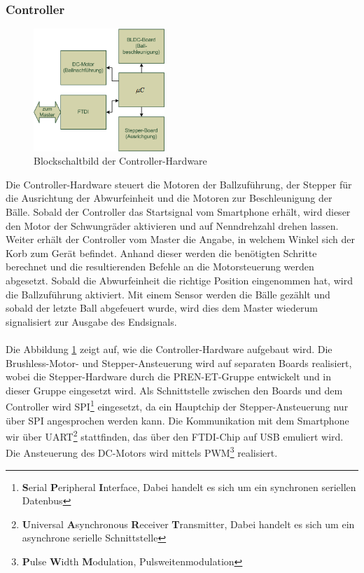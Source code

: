 \subsubsection{Controller}
\label{sec:Controller}
	\begin{figure}
		\centering
		\includegraphics[width=0.44\textwidth]{Enddokumentation/Loesungskonzept/Bilder/Blockschaltbild_Controller.png}
		\caption{Blockschaltbild der Controller-Hardware}
		\label{fig:Blockschaltbild_Controller}
	\end{figure}
	Die Controller-Hardware steuert die Motoren der Ballzuführung, der Stepper für die Ausrichtung 
	der Abwurfeinheit und die Motoren zur Beschleunigung der Bälle. Sobald der Controller das Startsignal vom Smartphone erhält, 
	wird dieser den Motor der Schwungräder aktivieren und auf Nenndrehzahl drehen lassen. Weiter erhält der Controller vom Master die Angabe, 
	in welchem Winkel sich der Korb zum Gerät befindet. Anhand dieser werden die benötigten Schritte berechnet und die resultierenden Befehle 
	an die Motorsteuerung werden abgesetzt. Sobald die Abwurfeinheit die richtige Position eingenommen hat, wird die Ballzuführung aktiviert. 
	Mit einem Sensor werden die Bälle gezählt und sobald der letzte Ball abgefeuert wurde, wird dies dem Master wiederum signalisiert zur Ausgabe des Endsignals.\\
	\\	
	Die Abbildung \ref{fig:Blockschaltbild_Controller} zeigt auf, wie die Controller-Hardware aufgebaut wird. 
	Die Brushless-Motor- und Stepper-Ansteuerung wird auf separaten Boards realisiert, wobei die Stepper-Hardware durch die PREN-ET-Gruppe
	entwickelt und in dieser Gruppe eingesetzt wird. Als Schnittstelle zwischen den Boards und dem Controller wird SPI\footnote{\textbf{S}erial \textbf{P}eripheral \textbf{I}nterface, Dabei handelt es sich um ein synchronen seriellen Datenbus} eingesetzt, 
	da ein Hauptchip der Stepper-Ansteuerung nur über SPI angesprochen werden kann. Die Kommunikation mit dem Smartphone wir über UART\footnote{\textbf{U}niversal \textbf{A}synchronous \textbf{R}eceiver \textbf{T}ransmitter, Dabei handelt es sich um ein asynchrone serielle Schnittstelle} stattfinden, 
	das über den FTDI-Chip auf USB emuliert wird. Die Ansteuerung des DC-Motors wird mittels PWM\footnote{\textbf{P}ulse \textbf{W}idth \textbf{M}odulation, Pulsweitenmodulation} realisiert.